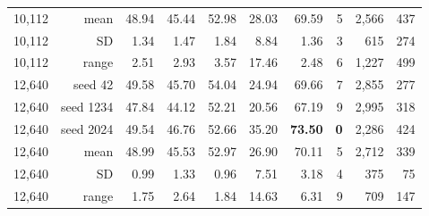 \begin{tabular}{lrrrrrrrrr}
10,112 & mean & 48.94 & 45.44 & 52.98 & 28.03 & 69.59 & 5 & 2,566 & 437 \\
10,112 & SD & 1.34 & 1.47 & 1.84 & 8.84 & 1.36 & 3 & 615 & 274 \\
10,112 & range & 2.51 & 2.93 & 3.57 & 17.46 & 2.48 & 6 & 1,227 & 499 \\
12,640 & seed 42 & 49.58 & 45.70 & 54.04 & 24.94 & 69.66 & 7 & 2,855 & 277 \\
12,640 & seed 1234 & 47.84 & 44.12 & 52.21 & 20.56 & 67.19 & 9 & 2,995 & 318 \\
12,640 & seed 2024 & 49.54 & 46.76 & 52.66 & 35.20 & \textbf{73.50} & \textbf{0} & 2,286 & 424 \\
12,640 & mean & 48.99 & 45.53 & 52.97 & 26.90 & 70.11 & 5 & 2,712 & 339 \\
12,640 & SD & 0.99 & 1.33 & 0.96 & 7.51 & 3.18 & 4 & 375 & 75 \\
12,640 & range & 1.75 & 2.64 & 1.84 & 14.63 & 6.31 & 9 & 709 & 147 \\
\bottomrule
\end{tabular}
